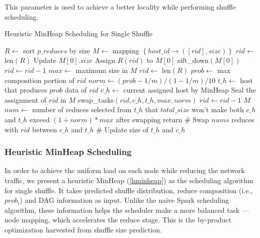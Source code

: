 This parameter is used to achieve a better locality while performing shuffle scheduling.

\begin{minipage}{\columnwidth}
\begin{algorithm}[H]
\caption{Heuristic MinHeap Scheduling for Single Shuffle}
\label{hminheap}
	\begin{algorithmic}[1]
	\small
		\State $R\gets$ sort $p\_reduces$ by size
		\State $M\gets$ mapping $\left\{ host\_id \rightarrow \left( \left[ rid \right], size \right) \right\}$
		\State $rid\gets$ len$\left(R\right)$
		\State Update $M\left[0\right].size$
		\State Assign $R\left(rid\right)$ to $M\left[0\right]$
		\State sift\_down$\left(M\left[0\right]\right)$
		\State
		\State $rid\gets rid-1$
		\EndWhile
		\State $max\gets$ maximum size in $M$
		\State $rid\gets$ len$\left(R\right)$
		\State $prob\gets$ max composition portion of $rid$
		\State $norm\gets \left(prob-1/m\right)/\left(1-1/m\right)/10$
		\State
		\State $t\_h\gets$ host that produces $prob$ data of $rid$
		\State $c\_h\gets$ current assigned host by MinHeap
			\State Seal the assignment of $rid$ in $M$
		\Else
			\State swap\_tasks$\left(rid, c\_h, t\_h, max, norm\right)$
		\EndIf
		\State $rid\gets rid-1$
		\EndWhile
		\Return $M$
	\EndProcedure
	\State $num\gets$ number of reduces
	\State selected from $t\_h$ that $total\_size$ won't
	\State make both $c\_h$ and $t\_h$ exceed $\left(1+norm\right)*max$
	\State after swapping
		\State return
	\Else
		\State \# Swap $nums$ reduces with $rid$ between $c\_h$ and $t\_h$
		\State \# Update size of $t\_h$ and $c\_h$
	\EndIf
	\EndProcedure
	\end{algorithmic}
\end{algorithm}
\end{minipage}


\subsubsection{Heuristic MinHeap Scheduling}\label{h-minheap}
In order to achieve the uniform load on each node while reducing the network traffic, we present a heuristic MinHeap (\ref{hminheap}) as the scheduling algorithm for single shuffle. It takes predicted shuffle distribution, reduce composition (i.e., $prob_i$) and DAG information as input. Unlike the na\"{i}ve Spark scheduling algorithm, these information helps the scheduler make a more balanced task --- node mapping, which accelerates the reduce stage. This is the by-product optimization harvested from shuffle size prediction.

